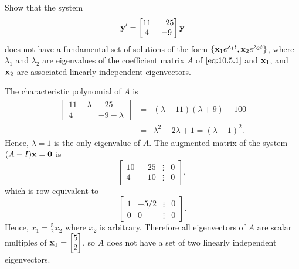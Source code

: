 \documentclass{ximera}
\begin{document}
\begin{example}\label{example:10.5.1}
Show that the system
\begin{equation}\label{eq:10.5.1}
{\bf y}'=\begin{bmatrix}11&-25\\4&-9\end{bmatrix}{\bf y}
\end{equation}
does not have a fundamental set of solutions of the form $\{{\bf
x}_1e^{\lambda_1t},{\bf x}_2e^{\lambda_2t}\}$, where $\lambda_1$ and
$\lambda_2$ are eigenvalues of the coefficient matrix $A$ of
$\eqref{eq:10.5.1}$ and ${\bf x}_1$, and ${\bf x}_2$ are associated
linearly independent eigenvectors.

\begin{explanation}   
The characteristic polynomial of $A$ is
\begin{eqnarray*}
\begin{vmatrix}11-\lambda&-25\\4&-9-\lambda\end{vmatrix}
&=&(\lambda-11)(\lambda+9)+100\\
&=&\lambda^2-2\lambda+1=(\lambda-1)^2.
\end{eqnarray*}
Hence, $\lambda=1$ is the only eigenvalue of $A$. The augmented
matrix of the system $(A-I){\bf x}={\bf 0}$ is
$$
\begin{bmatrix}10&-25&\vdots&0\\4&
-10&\vdots&0\end{bmatrix},
$$
which is row equivalent to
$$
\begin{bmatrix}1&-5/2&\vdots&0\\0&
0&\vdots&0\end{bmatrix}.
$$
Hence, $x_1=\frac{5}{2}x_2$ where $x_2$ is arbitrary. Therefore all
eigenvectors of $A$ are scalar multiples of ${\bf
x}_1=\begin{bmatrix}5\\2\end{bmatrix}$,
so $A$ does not have a set of two linearly independent eigenvectors.
\end{explanation}
\end{example}
\end{document}
